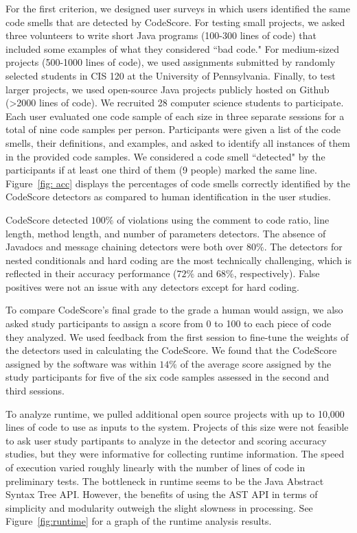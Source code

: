 \documentclass{sig-alternate}
\begin{document}
For the first criterion, we designed user surveys in which users identified
the same code smells that are detected by CodeScore. For testing small projects,
we asked three volunteers to write short Java programs (100-300 lines of code) 
that included some examples of what they considered ``bad code." For medium-sized
projects (500-1000 lines of code), we used assignments submitted by
randomly selected students in CIS 120 at the University of Pennsylvania. Finally, to test larger
projects, we used open-source Java projects publicly hosted on Github (>2000
lines of code). We recruited 28 computer science students to participate. Each user evaluated one
code sample of each size in three separate sessions for a total of nine code
samples per person. Participants were given a list of the code smells, their
definitions, and examples, and asked to identify all instances of them in the
provided code samples. We considered a code smell
``detected" by the participants if at least one third of them (9 people) marked the same
line. Figure~\ref{fig: acc} displays the percentages of code smells correctly
identified by the CodeScore detectors as compared to human identification in the
user studies. 

CodeScore detected $100\%$ of violations using the comment to code ratio, line
length, method length, and number of parameters detectors. The absence of
Javadocs and message chaining detectors were both over $80\%$. The detectors
for nested conditionals and hard coding are the most technically challenging,
which is reflected in their accuracy performance ($72\%$ and $68\%$,
respectively). False positives were not an issue with any detectors except for
hard coding.

To compare CodeScore's final grade to the grade a human would assign, we also asked study
participants to assign a score from 0 to 100 to each piece of code they analyzed. We used
feedback from the first session to fine-tune the weights of the detectors used
in calculating the CodeScore. We found that the CodeScore assigned by the
software was within $14\%$ of the average score assigned by the study
participants for five of the six code samples assessed in the second and third
sessions.  

To analyze runtime, we pulled additional open source projects with up to
10,000 lines of code to use as inputs to the system. Projects of this size were not feasible to ask user study
partipants to analyze in the detector and scoring accuracy studies, but they were informative for collecting runtime
information. The speed of execution varied roughly linearly with the number of lines of code in
preliminary tests. The bottleneck in runtime seems to be the Java Abstract
Syntax Tree API. However, the benefits of using the AST API in terms of simplicity and
modularity outweigh the slight slowness in processing. See Figure~\ref{fig:runtime} for a graph of the runtime analysis results.
\end{document}
